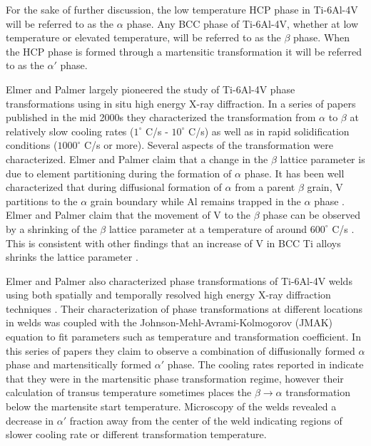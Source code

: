 For the sake of further discussion, the low temperature HCP phase in Ti-6Al-4V will be referred to as the $\alpha$ phase. Any BCC phase of Ti-6Al-4V, whether at low temperature or elevated temperature, will be referred to as the $\beta$ phase. When the HCP phase is formed through a martensitic transformation it will be referred to as the $\alpha'$ phase.

Elmer and Palmer largely pioneered the study of Ti-6Al-4V phase transformations using in situ high energy X-ray diffraction. In a series of papers published in the mid 2000s they characterized the transformation from $\alpha$ to $\beta$ at relatively slow cooling rates ($1^{\circ}$ C/s - $10^{\circ}$ C/s) as well as in rapid solidification conditions ($1000^{ \circ}$ C/s or more). Several aspects of the transformation were characterized. Elmer and Palmer claim that a change in the $\beta$ lattice parameter is due to element partitioning during the formation of $\alpha$ phase. It has been well characterized that during diffusional formation of $\alpha$ from a parent $\beta$ grain, V partitions to the $\alpha$ grain boundary while Al remains trapped in the $\alpha$ phase \cite{Williams1967, Sridharan2019, Tan2015, Nandwana2019}. Elmer and Palmer claim that the movement of V to the $\beta$ phase can be observed by a shrinking of the $\beta$ lattice parameter at a temperature of around $600^\circ$ C/s \cite{Elmer2005}. This is consistent with other findings that an increase of V in BCC Ti alloys shrinks the lattice parameter \cite{Xu2015}.

Elmer and Palmer also characterized phase transformations of Ti-6Al-4V welds using both spatially and temporally resolved high energy X-ray diffraction techniques \cite{Elmer2004, Elmer2003}. Their characterization of phase transformations at different locations in welds was coupled with the Johnson-Mehl-Avrami-Kolmogorov (JMAK) equation to fit parameters such as temperature and transformation coefficient. In this series of papers they claim to observe a combination of diffusionally formed $\alpha$ phase and martensitically formed $\alpha'$ phase. The cooling rates reported in \cite{Elmer2003} indicate that they were in the martensitic phase transformation regime, however their calculation of transus temperature sometimes places the $\beta \to \alpha$ transformation below the martensite start temperature. Microscopy of the welds revealed a decrease in $\alpha'$ fraction away from the center of the weld indicating regions of slower cooling rate or different transformation temperature.

